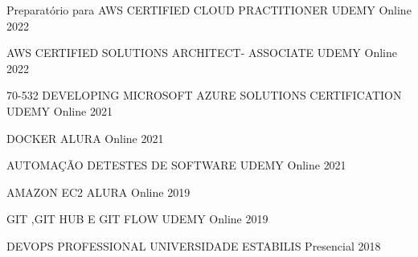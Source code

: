

\begin{cvhonors}

  \cvhonor
    {Preparatório para AWS CERTIFIED CLOUD PRACTITIONER} %
    {UDEMY} %
    {Online} %
    {2022} %

  \cvhonor
    {AWS CERTIFIED SOLUTIONS ARCHITECT- ASSOCIATE} %
    {UDEMY} %
    {Online} %
    {2022} %

  \cvhonor
    {70-532 DEVELOPING MICROSOFT AZURE SOLUTIONS CERTIFICATION} %
    {UDEMY} %
    {Online} %
    {2021} %

  \cvhonor
    {DOCKER} %
    {ALURA} %
    {Online} %
    {2021} %

  \cvhonor
    {AUTOMAÇÃO DETESTES DE SOFTWARE} %
    {UDEMY} %
    {Online} %
    {2021} %

  \cvhonor
    {AMAZON EC2} %
    {ALURA} %
    {Online} %
    {2019} %

  \cvhonor
    {GIT ,GIT HUB E GIT FLOW} %
    {UDEMY} %
    {Online} %
    {2019} %

  \cvhonor
    {DEVOPS PROFESSIONAL} %
    {UNIVERSIDADE ESTABILIS} %
    {Presencial} %
    {2018} %


\end{cvhonors}
